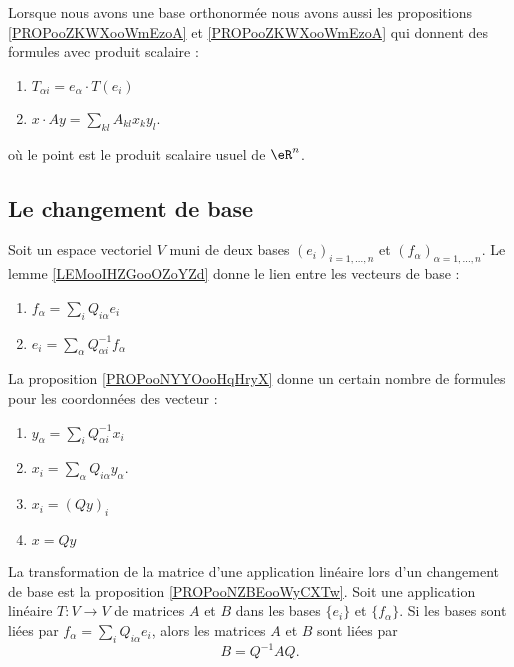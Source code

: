 Lorsque nous avons une base orthonormée nous avons aussi les propositions \ref{PROPooZKWXooWmEzoA} et \ref{PROPooZKWXooWmEzoA} qui donnent des formules avec produit scalaire :
\begin{enumerate}
    \item
    $T_{\alpha i}=e_{\alpha}\cdot T(e_i)$
    \item
    $x\cdot Ay=\sum_{kl}A_{kl}x_ky_l$.
\end{enumerate}
où le point est le produit scalaire usuel de \( \eR^n\).

\subsection{Le changement de base}

Soit un espace vectoriel \( V\) muni de deux bases \( (e_i)_{i=1,\ldots, n}\) et \( (f_{\alpha})_{\alpha=1,\ldots, n}\). Le lemme \ref{LEMooIHZGooOZoYZd} donne le lien entre les vecteurs de base :
\begin{enumerate}
    \item
        $f_{\alpha}=\sum_iQ_{i\alpha}e_i$
    \item
        $e_i=\sum_{\alpha}Q^{-1}_{\alpha i}f_{\alpha}$
\end{enumerate}
La proposition \ref{PROPooNYYOooHqHryX} donne un certain nombre de formules pour les coordonnées des vecteur :
\begin{enumerate}
    \item   
        \( y_{\alpha}=\sum_iQ^{-1}_{\alpha i}x_i\)
    \item  
        $x_i=\sum_{\alpha}Q_{i\alpha}y_{\alpha}$.
    \item
    $x_i=(Qy)_i$ 
    \item
    $x=Qy$
\end{enumerate}

La transformation de la matrice d'une application linéaire lors d'un changement de base est la proposition \ref{PROPooNZBEooWyCXTw}. Soit une application linéaire \( T\colon V\to V\) de matrices \( A\) et \( B\) dans les bases \( \{ e_i \}\) et \( \{ f_{\alpha} \}\). Si les bases sont liées par $f_{\alpha}=\sum_iQ_{i\alpha}e_i$, alors les matrices \( A\) et \( B\) sont liées par
    \begin{equation}
        B=Q^{-1}AQ.
    \end{equation}

